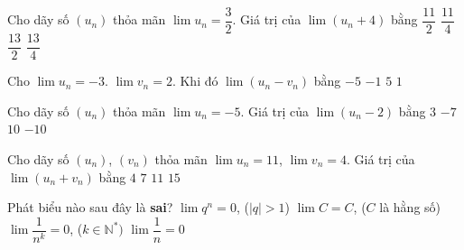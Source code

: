 

\begin{ex}%
	Cho dãy số $\left(u_n\right)$ thỏa mãn  $\lim u_n=\dfrac{3}{2}$. Giá trị của $\lim\left(u_n+4\right)$ bằng
	 \choice
		 {\True $\dfrac{11}{2}$}
		{$\dfrac{11}{4}$} 
		{$\dfrac{13}{2}$} 
		{$\dfrac{13}{4}$} 
\end{ex}

\begin{ex}%
	 Cho $\lim u_n=-3$. $\lim v_n=2$. Khi đó $\lim\left(u_n-v_n\right)$ bằng
	 \choice
		 {\True $-5$}
		 {$-1$}
		 {$5$}
		 {$1$}
\end{ex}

\begin{ex}%
	Cho dãy số $\left(u_n\right)$ thỏa  mãn $\lim u_n=-5$. Giá trị của $\lim\left(u_n-2\right)$ bằng
	 \choice
		{$3$} 
		{\True  $-7$}
		{$10$} 
		 {$-10$}
\end{ex}

\begin{ex}%
	Cho  dãy số $\left(u_n\right)$, $\left(v_n\right)$ thỏa mãn $\lim u_n=11$, $\lim v_n=4$. Giá trị của $\lim\left(u_n+v_n\right)$ bằng
	 \choice
		 {$4$}
		{$7$} 
		{$11$} 
		{\True $15$} 
\end{ex}

\begin{ex}%
	Phát biểu nào  sau đây là {\bf sai}?
	 \choice
		{\True $\lim  q^n=0$, ($|q|>1$)}
		{$\lim C=C$, ($C$ là hằng  số)}
		{$\lim\dfrac{1}{n^k}=0$,  ($k\in\mathbb{N}^*)$}
		 {$\lim\dfrac{1}{n}=0$}
\end{ex}

